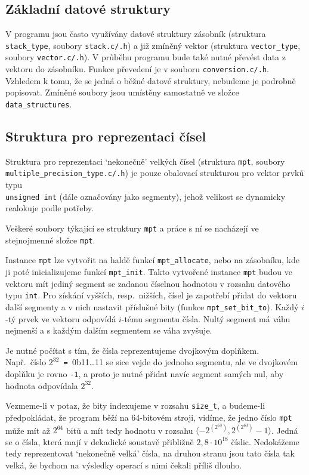 \subsection{Základní datové struktury}
V programu jsou často využívány datové struktury zásobník (struktura \verb|stack_type|, soubory \verb|stack.c/.h|) a již zmíněný vektor (struktura \verb|vector_type|, soubory \verb|vector.c/.h|).
V průběhu programu bude také nutné převést data z vektoru do zásobníku. Funkce převedení je v souboru \verb|conversion.c/.h|. Vzhledem k tomu, že se jedná o běžné datové struktury, nebudeme je podrobně popisovat. Zmíněné soubory jsou umístěny samostatně ve složce \verb|data_structures|. 

\subsection{Struktura pro reprezentaci čísel}\label{subsection:mpt}
Struktura pro reprezentaci `nekonečně' velkých čísel (struktura \verb|mpt|, soubory \\ \verb|multiple_precision_type.c/.h|) je pouze obalovací strukturou pro vektor prvků typu \\ \verb|unsigned int| (dále označovány jako segmenty), jehož velikost se dynamicky realokuje podle potřeby.

Veškeré soubory týkající se struktury \verb|mpt| a práce s ní se nacházejí ve stejnojmenné složce \verb|mpt|.

Instance \verb|mpt| lze vytvořit na haldě funkcí \verb|mpt_allocate|, nebo na zásobníku, kde ji poté inicializujeme funkcí \verb|mpt_init|.
Takto vytvořené instance \verb|mpt| budou ve vektoru mít jediný segment se zadanou číselnou hodnotou v rozsahu datového typu \verb|int|. Pro získání vyšších, resp.~nižších, čísel je zapotřebí přidat do vektoru další segmenty a v nich nastavit příslušné bity (funkce \verb|mpt_set_bit_to|). Každý $i$-tý prvek ve vektoru odpovídá $i$-tému segmentu čísla. Nultý segment má váhu nejmenší a s každým dalším segmentem se váha zvyšuje.

Je nutné počítat s tím, že čísla reprezentujeme dvojkovým doplňkem. \\Např.~číslo $2^{32}$\verb| = |0b11\dots 11 se sice vejde do jednoho segmentu, ale ve dvojkovém doplňku je rovno \verb|-1|, a proto je nutné přidat navíc segment samých nul, aby hodnota odpovídala $2^{32}$.

Vezmeme-li v potaz, že bity indexujeme v rozsahu \verb|size_t|, a budeme-li předpokládat, že program běží na 64-bitovém stroji, vidíme, že jedno číslo \verb|mpt| může mít až $2^{64}$ bitů a mít tedy hodnotu v rozsahu $\langle-2^{(2^{63})}, 2^{(2^{63})}-1\rangle$. Jedná se o čísla, která mají v dekadické soustavě přibližně $2,8\cdot{}10^{18}$ číslic. Nedokážeme tedy reprezentovat `nekonečně velká' čísla, na druhou stranu jsou tato čísla tak velká, že bychom na výsledky operací s nimi čekali příliš dlouho.

